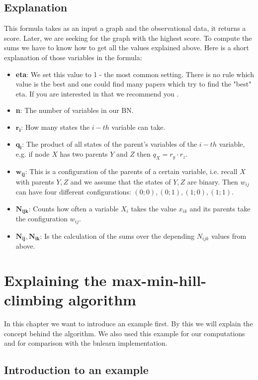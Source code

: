	\section*{Explanation}

		This formula takes as an input a graph and the observational data, it returns a score. Later, we are seeking for the graph with the highest score. To compute the sums we have to know how to get all the values explained above. Here is a short explanation of those variables in the formula:

		\begin{itemize}
			\item \textbf{eta}: We set this value to 1 - the most common setting. There is no rule which value is the best and one could find many papers which try to find the "best" eta. If you are interested in that we recommend you \cite{SKM}.
			\item \textbf{n}: The number of variables in our BN.
			\item $\boldsymbol{r_{i}}$: How many states the $i-th$ variable can take.
			\item $\boldsymbol{q_{i}}$: The product of all states of the parent's variables of the $i-th$ variable, e.g. if node $X$ has two parents $Y$ and $Z$ then $q_{X} = r_{y} \cdot r_{z}$.
			\item $\boldsymbol{w_{ij}}$: This is a configuration of the parents of a certain variable, i.e. recall $X$ with parents $Y, Z$ and we assume that the states of $Y, Z$ are binary. Then $w_{ij}$ can have four different configurations: $(0; 0), (0; 1), (1; 0), (1; 1)$.
			\item $\boldsymbol{N_{ijk}}$: Counts how often a variable $X_{i}$ takes the value $x_{ik}$ and its parents take the configuration $w_{ij}$.
			\item $\boldsymbol{N_{ij}, N_{ik}}$: Is the calculation of the sums over the depending $N_{ijk}$ values from above.
		\end{itemize}

\chapter{Explaining the max-min-hill-climbing algorithm}

	In this chapter we want to introduce an example first. By this we will explain the concept behind the algorithm. We also used this example for our computations and for comparison with the bnlearn implementation.

	\section{Introduction to an example} \label{s.example}


